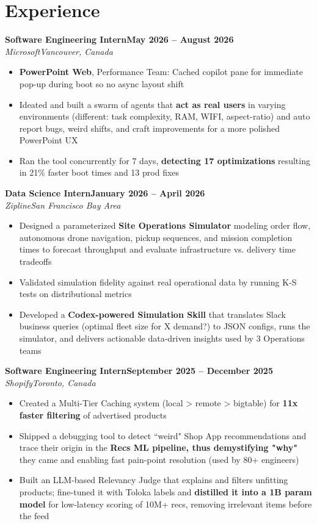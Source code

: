 \documentclass[letterpaper,10pt]{article}
\newcommand{\entry}[4]{\textbf{#1}\hfill\textbf{\small #2}\\\textit{\small #3}\hfill\textit{\small #4}\par}
\begin{document}
\section{Experience}
\entry{Software Engineering Intern}{May 2026 -- August 2026}{Microsoft}{Vancouver, Canada}
\begin{itemize}\small
\item \textbf{PowerPoint Web}, Performance Team: Cached copilot pane for immediate pop-up during boot so no async layout shift
\item Ideated and built a swarm of agents that \textbf{act as real users} in varying environments (different: task complexity, RAM, WIFI, aspect-ratio) and auto report bugs, weird shifts, and craft improvements for a more polished PowerPoint UX
\item Ran the tool concurrently for 7 days, \textbf{detecting 17 optimizations} resulting in 21\% faster boot times and 13 prod fixes
\end{itemize}\vspace{2pt}
\entry{Data Science Intern}{January 2026 -- April 2026}{Zipline}{San Francisco Bay Area}
\begin{itemize}\small
\item Designed a parameterized \textbf{Site Operations Simulator} modeling order flow, autonomous drone navigation, pickup sequences, and mission completion times to forecast throughput and evaluate infrastructure vs. delivery time tradeoffs
\item Validated simulation fidelity against real operational data by running K-S tests on distributional metrics
\item Developed a \textbf{Codex-powered Simulation Skill} that translates Slack business queries (optimal fleet size for X demand?) to JSON configs, runs the simulator, and delivers actionable data-driven insights used by 3 Operations teams
\end{itemize}\vspace{2pt}
\entry{Software Engineering Intern}{September 2025 -- December 2025}{Shopify}{Toronto, Canada}
\begin{itemize}\small
\item Created a Multi-Tier Caching system (local \textgreater{} remote \textgreater{} bigtable) for \textbf{11x faster filtering} of advertised products
\item Shipped a debugging tool to detect ``weird" Shop App recommendations and trace their origin in the \textbf{Recs ML pipeline, thus demystifying "why"} they came and enabling fast pain-point resolution (used by 80+ engineers)
\item Built an LLM-based Relevancy Judge that explains and filters unfitting products; fine-tuned it with Toloka labels and \textbf{distilled it into a 1B param model} for low-latency scoring of 10M+ recs, removing irrelevant items before the feed
\end{itemize}\vspace{2pt}
\end{document}

